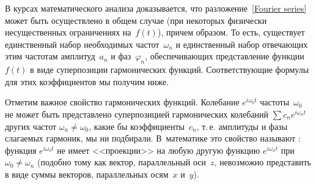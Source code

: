 В курсах математического анализа доказывается, что
разложение~\eqref{Fourier series} может быть осуществлено в общем случае (при
некоторых физически несущественных
ограничениях на~$f(t)$), причем  образом.
То есть, существует единственный набор необходимых частот~$\omega_n$ и
единственный набор отвечающих этим частотам амплитуд~$a_n$ и фаз~$\varphi_n$,
обеспечивающих представление функции~$f(t)$ в виде суперпозиции гармонических
функций. Соответствующие формулы для этих коэффициентов мы получим ниже.

Отметим важное свойство гармонических функций.
Колебание $e^{i\omega_0 t}$ частоты~$\omega_0$ не может быть
представлено суперпозицией гармонических колебаний $\sum c_n e^{i\omega_n t}$
других частот $\omega_n\ne\omega_0$, какие бы коэффициенты~$c_n$, т.\,е.
амплитуды и фазы слагаемых гармоник, мы ни подбирали. В~математике это
свойство называют : функция $e^{i\omega_0 t}$
не имеет <<проекции>> на любую другую функцию $e^{i\omega_nt}$ при
$\omega_0\ne\omega_n$ (подобно тому как вектор, параллельный оси~$z$,
невозможно представить в виде суммы векторов, параллельных осям~$x$ и~$y$).

